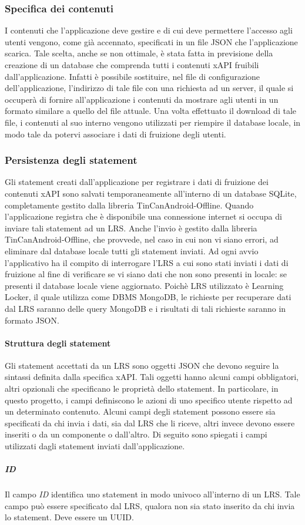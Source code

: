 \documentclass[../Tesi.tex]{subfiles}
\begin{document}
			\subsubsection{Specifica dei contenuti}
			I contenuti che l'applicazione deve gestire e di cui deve permettere l'accesso agli utenti vengono, come già accennato, specificati in un file JSON che l'applicazione scarica. Tale scelta, anche se non ottimale, è stata fatta in previsione della creazione di un database che comprenda tutti i contenuti xAPI fruibili dall'applicazione. Infatti è possibile sostituire, nel file di configurazione dell'applicazione, l'indirizzo di tale file con una richiesta ad un server, il quale si occuperà di fornire all'applicazione i contenuti da mostrare agli utenti in un formato similare a quello del file attuale. Una volta effettuato il download di tale file, i contenuti al suo interno vengono utilizzati per riempire il database locale, in modo tale da potervi associare i dati di fruizione degli utenti.

			\subsubsection{Persistenza degli statement}
			Gli statement creati dall'applicazione per registrare i dati di fruizione dei contenuti xAPI sono salvati temporaneamente all'interno di un database SQLite, completamente gestito dalla libreria TinCanAndroid-Offline. Quando l'applicazione registra che è disponibile una connessione internet si occupa di inviare tali statement ad un LRS. Anche l'invio è gestito dalla libreria TinCanAndroid-Offline, che provvede, nel caso in cui non vi siano errori, ad eliminare dal database locale tutti gli statement inviati. Ad ogni avvio l'applicativo ha il compito di interrogare l'LRS a cui sono stati inviati i dati di fruizione al fine di verificare se vi siano dati che non sono presenti in locale: se presenti il database locale viene aggiornato. Poichè LRS utilizzato è Learning Locker, il quale utilizza come DBMS MongoDB, le richieste per recuperare dati dal LRS saranno delle query MongoDB e i risultati di tali richieste saranno in formato JSON.
				\paragraph{Struttura degli statement}
				Gli statement accettati da un LRS sono oggetti JSON che devono seguire la sintassi definita dalla specifica xAPI. Tali oggetti hanno alcuni campi obbligatori, altri opzionali che specificano le proprietà dello statement. In particolare, in questo progetto, i campi definiscono le azioni di uno specifico utente rispetto ad un determinato contenuto. Alcuni campi degli statement possono essere sia specificati da chi invia i dati, sia dal LRS che li riceve, altri invece devono essere inseriti o da un componente o dall'altro. Di seguito sono spiegati i campi utilizzati dagli statement inviati dall'applicazione.
					\subparagraph{ID}
					Il campo \textit{ID} identifica uno statement in modo univoco all'interno di un LRS. Tale campo può essere specificato dal LRS, qualora non sia stato inserito da chi invia lo statement. Deve essere un UUID.
\end{document}
